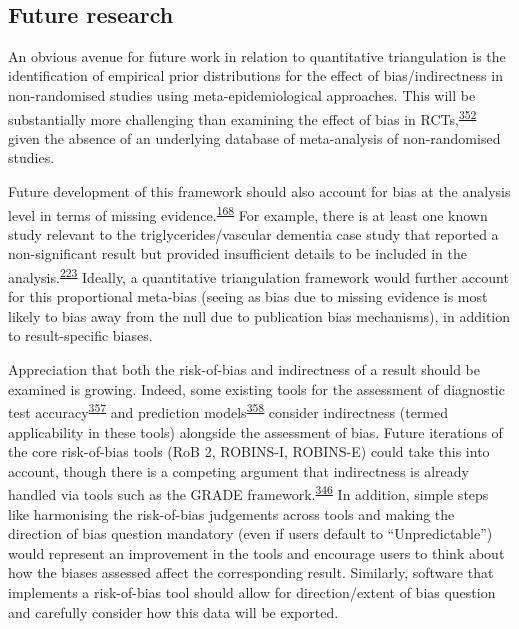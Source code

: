 \documentclass[a4paper, twoside]{templates/ociamthesis}
\begin{document}
~

\hypertarget{future-research}{%
\subsection{Future research}\label{future-research}}

An obvious avenue for future work in relation to quantitative triangulation is the identification of empirical prior distributions for the effect of bias/indirectness in non-randomised studies using meta-epidemiological approaches. This will be substantially more challenging than examining the effect of bias in RCTs,\textsuperscript{\protect\hyperlink{ref-savovic2018}{352}} given the absence of an underlying database of meta-analysis of non-randomised studies.

Future development of this framework should also account for bias at the analysis level in terms of missing evidence.\textsuperscript{\protect\hyperlink{ref-zotero-15123}{168}} For example, there is at least one known study relevant to the triglycerides/vascular dementia case study that reported a non-significant result but provided insufficient details to be included in the analysis.\textsuperscript{\protect\hyperlink{ref-chiang2007}{223}} Ideally, a quantitative triangulation framework would further account for this proportional meta-bias (seeing as bias due to missing evidence is most likely to bias away from the null due to publication bias mechanisms), in addition to result-specific biases.

Appreciation that both the risk-of-bias and indirectness of a result should be examined is growing. Indeed, some existing tools for the assessment of diagnostic test accuracy\textsuperscript{\protect\hyperlink{ref-whiting2011}{357}} and prediction models\textsuperscript{\protect\hyperlink{ref-moons2019}{358}} consider indirectness (termed applicability in these tools) alongside the assessment of bias. Future iterations of the core risk-of-bias tools (RoB 2, ROBINS-I, ROBINS-E) could take this into account, though there is a competing argument that indirectness is already handled via tools such as the GRADE framework.\textsuperscript{\protect\hyperlink{ref-guyatt2011}{346}} In addition, simple steps like harmonising the risk-of-bias judgements across tools and making the direction of bias question mandatory (even if users default to ``Unpredictable'') would represent an improvement in the tools and encourage users to think about how the biases assessed affect the corresponding result. Similarly, software that implements a risk-of-bias tool should allow for direction/extent of bias question and carefully consider how this data will be exported.
\end{document}
